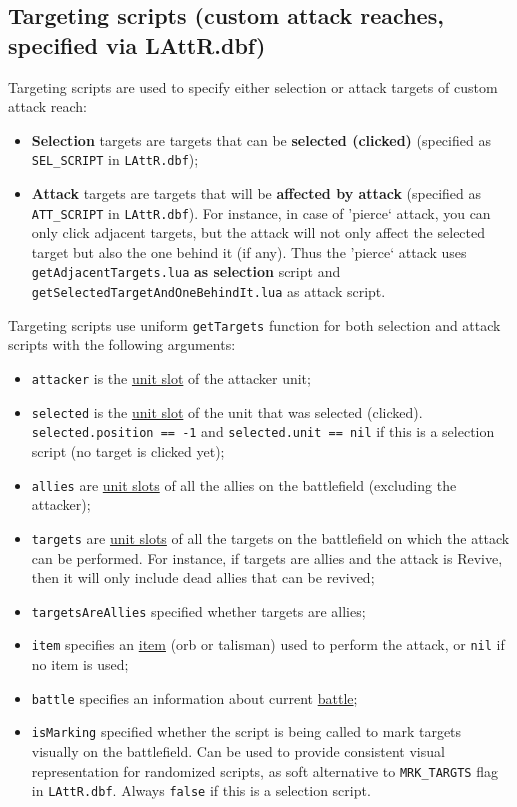 \subsection{Targeting scripts (custom attack reaches, specified via LAttR.dbf)}
Targeting scripts are used to specify either selection or attack targets of custom attack reach:
\begin{itemize}
\item \textbf{Selection} targets are targets that can be \textbf{selected (clicked)} (specified as \texttt{SEL\_SCRIPT} in \texttt{LAttR.dbf});
\item \textbf{Attack} targets are targets that will be \textbf{affected by attack} (specified as \texttt{ATT\_SCRIPT} in \texttt{LAttR.dbf}). For instance, in case of 'pierce` attack, you can only click adjacent targets, but the attack will not only affect the selected target but also the one behind it (if any). Thus the 'pierce` attack uses \texttt{getAdjacentTargets.lua} \textbf{as selection} script and \texttt{getSelectedTargetAndOneBehindIt.lua} as attack script.
\end{itemize}
Targeting scripts use uniform \texttt{getTargets} function for both selection and attack scripts with the following arguments:
\begin{itemize}
\item \texttt{attacker} is the \hyperref[UnitSlot]{unit slot} of the attacker unit;
\item \texttt{selected} is the \hyperref[UnitSlot]{unit slot} of the unit that was selected (clicked).\\
\texttt{selected.position == -1} and \texttt{selected.unit == nil} if this is a selection script (no target is clicked yet);
\item \texttt{allies} are \hyperref[UnitSlot]{unit slots} of all the allies on the battlefield (excluding the attacker);
\item \texttt{targets} are \hyperref[UnitSlot]{unit slots} of all the targets on the battlefield on which the attack can be performed. For instance, if targets are allies and the attack is Revive, then it will only include dead allies that can be revived;
\item \texttt{targetsAreAllies} specified whether targets are allies;
\item \texttt{item} specifies an \hyperref[Item]{item} (orb or talisman) used to perform the attack, or \texttt{nil} if no item is used;
\item \texttt{battle} specifies an information about current \hyperref[Battle]{battle};
\item \texttt{isMarking} specified whether the script is being called to mark targets visually on the battlefield. Can be used to provide consistent visual representation for randomized scripts, as soft alternative to \texttt{MRK\_TARGTS} flag in \texttt{LAttR.dbf}. Always \texttt{false} if this is a selection script.
\end{itemize}
